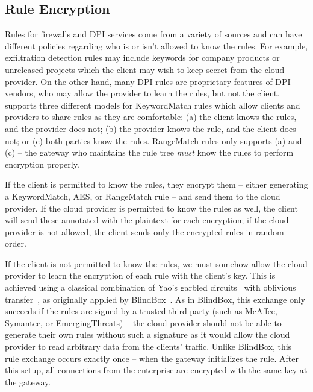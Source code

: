 \subsection{Rule Encryption}
\label{sec:rulenc}

Rules for firewalls and DPI services come from a variety of sources and can have different policies regarding who is or isn't allowed to know the rules. 
For example, exfiltration detection rules may include keywords for company products or unreleased projects which the client may wish to keep secret from the cloud provider. 
On the other hand, many DPI rules are proprietary features of DPI vendors, who may allow the provider to learn the rules, but not the client.
\sys supports three different models for KeywordMatch rules which allow clients and providers to share rules as they are comfortable: (a) the client knows the rules, and the provider does not; (b) the provider knows the rule, and the client does not; or (c) both parties know the rules.
RangeMatch rules only supports (a) and (c) -- the gateway who maintains the rule tree {\it must} know the rules to perform encryption properly.

If the client is permitted to know the rules, they encrypt them -- either generating a KeywordMatch, AES, or RangeMatch rule -- and send them to the cloud provider. If the cloud provider is permitted to know the rules as well, the client will send these annotated with the plaintext for each encryption; if the cloud provider is not allowed, the client sends only the encrypted rules in random order.

If the client is not permitted to know the rules, we must somehow allow the cloud provider to learn the encryption of each rule with the client's key. This is achieved using a classical combination of Yao's garbled circuits~\cite{Yao86} with oblivious transfer~\cite{Naor-Pinkas}, as originally applied by BlindBox~\cite{blindbox}.
As in BlindBox, this exchange only succeeds if the rules are signed by a trusted third party (such as McAffee, Symantec, or EmergingThreats) -- the cloud provider should not be able to generate their own rules without such a signature as it would allow the cloud provider to read arbitrary data from the clients' traffic.
Unlike BlindBox, this rule exchange occurs exactly once -- when the gateway initializes the rule. 
After this setup, all connections from the enterprise are encrypted with the same key at the gateway.

